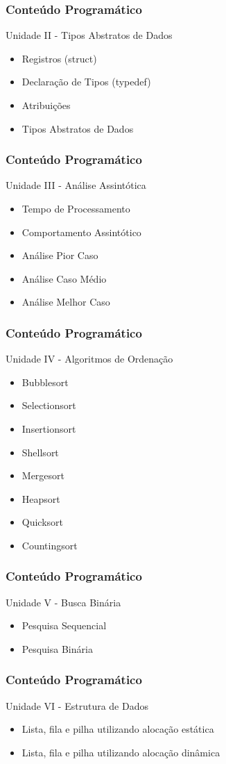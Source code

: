 \documentclass[aspectratio=169]{beamer}
\begin{document}
\begin{frame}
\frametitle{Conteúdo Programático}
Unidade II - Tipos Abstratos de Dados
\begin{itemize}
 \item Registros (struct)
 \item Declaração de Tipos (typedef)
 \item Atribuições
 \item Tipos Abstratos de Dados
\end{itemize}
\end{frame}


\begin{frame}
\frametitle{Conteúdo Programático}
Unidade III - Análise Assintótica
\begin{itemize}
 \item Tempo de Processamento
 \item Comportamento Assintótico
 \item Análise Pior Caso
 \item Análise Caso Médio
 \item Análise Melhor Caso
\end{itemize}
\end{frame}

\begin{frame}
\frametitle{Conteúdo Programático}
Unidade IV - Algoritmos de Ordenação
\begin{itemize}
 \item Bubblesort
 \item Selectionsort
 \item Insertionsort
 \item Shellsort
 \item Mergesort
 \item Heapsort
 \item Quicksort
 \item Countingsort
\end{itemize}
\end{frame}


\begin{frame}
\frametitle{Conteúdo Programático}
Unidade V - Busca Binária
\begin{itemize}
 \item Pesquisa Sequencial
 \item Pesquisa Binária
\end{itemize}
\end{frame}

\begin{frame}
\frametitle{Conteúdo Programático}
Unidade VI - Estrutura de Dados
\begin{itemize}
 \item Lista, fila e pilha utilizando alocação estática
 \item Lista, fila e pilha utilizando alocação dinâmica
\end{itemize}
\end{frame}
\end{document}
